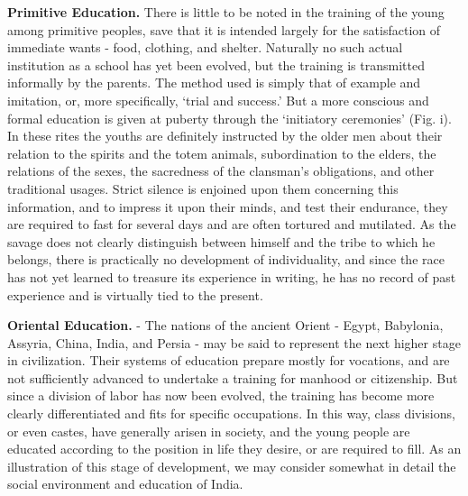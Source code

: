 \documentclass[]{book}
\begin{document}
\textbf{Primitive Education.} There is little to be noted in the training of the young among primitive peoples, save that it is intended largely for the satisfaction of immediate wants - food, clothing, and shelter. Naturally no such actual institution as a school has yet been evolved, but the training is transmitted informally by the parents. The method used is simply that of example and imitation, or, more specifically, `trial and success.' But a more conscious and formal education is given at puberty through the `initiatory ceremonies' (Fig. i). In these rites the youths are definitely instructed by the older men about their relation to the spirits and the totem animals, subordination to the elders, the relations of the sexes, the sacredness of the clansman's obligations, and other traditional usages. Strict silence is enjoined upon them concerning this information, and to impress it upon their minds, and test their endurance, they are required to fast for several days and are often tortured and mutilated. As the savage does not clearly distinguish between himself and the tribe to which he belongs, there is practically no development of individuality, and since the race has not yet learned to treasure its experience in writing, he has no record of past experience and is virtually tied to the present.

\textbf{Oriental Education.} - The nations of the ancient Orient - Egypt, Babylonia, Assyria, China, India, and Persia - may be said to represent the next higher stage in civilization. Their systems of education prepare mostly for vocations, and are not sufficiently advanced to undertake a training for manhood or citizenship. But since a division of labor has now been evolved, the training has become more clearly differentiated and fits for specific occupations. In this way, class divisions, or even castes, have generally arisen in society, and the young people are educated according to the position in life they desire, or are required to fill. As an illustration of this stage of development, we may consider somewhat in detail the social environment and education of India.
\end{document}
